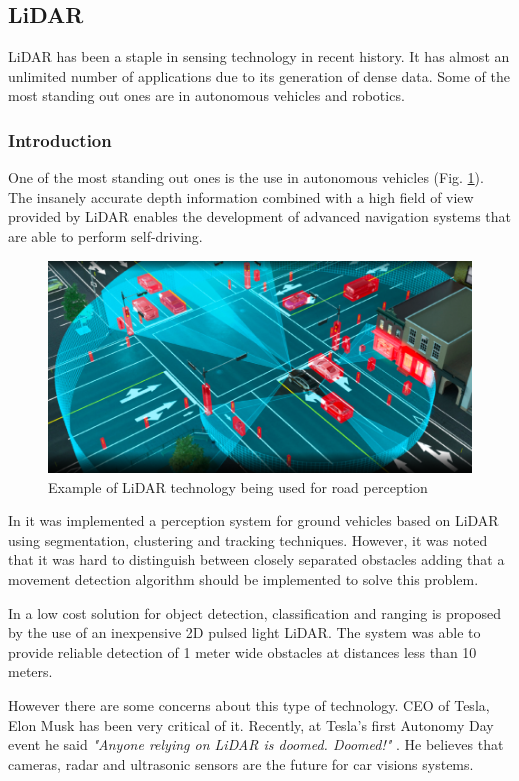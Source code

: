 \subsection{LiDAR}
\ac{LiDAR} has been a staple in sensing technology in recent history. It has almost an  unlimited  number of applications \cite{lidar100uses} due to its generation of dense data. Some of the most standing out ones are in autonomous vehicles and robotics. 
\subsubsection{Introduction}

 One of the most standing out ones is the use in autonomous vehicles (Fig. \ref{fig:lidarcar}). The insanely accurate depth information combined with a high field of view provided by \ac{LiDAR} enables the development of advanced navigation systems that are able to perform self-driving.
\begin{figure}[h] 
\centerline{\includegraphics [width=0.7 \textwidth]{imgs/chapter2/lidarcar.png}}
\caption{Example of \ac{LiDAR} technology being used for road perception \cite{lidarcar}}
\label{fig:lidarcar}
\end{figure}

In \cite{lidarperception}  it was implemented a perception system for ground vehicles based on \ac{LiDAR} using segmentation, clustering and tracking techniques. However, it was noted that it was hard to distinguish between closely  separated obstacles adding that a movement detection algorithm should be implemented to solve this problem. 

In \cite{car2dlidar} a low cost solution for object detection, classification and ranging is  proposed by the use of an inexpensive 2D pulsed light \ac{LiDAR}. The system was able to provide reliable detection of 1 meter wide obstacles at distances less than 10 meters.


However there are some concerns about this type of technology. CEO of Tesla, Elon Musk has been very critical of it. Recently, at Tesla’s first Autonomy Day event  he said \textit{"Anyone relying on \ac{LiDAR} is doomed. Doomed!"} \cite{elon}. He believes that cameras, radar and ultrasonic sensors are the future for car visions systems. 

